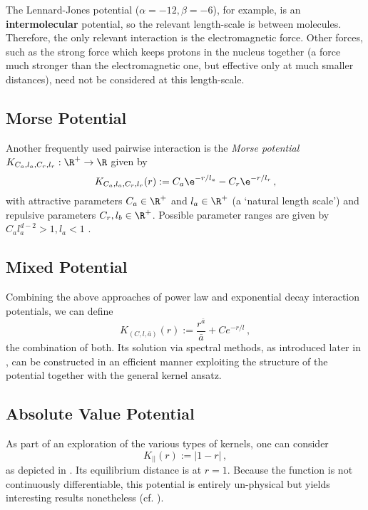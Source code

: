 The Lennard-Jones potential ($\alpha=-12, \beta=-6$), for example, is an \textbf{intermolecular} potential, so the relevant length-scale is between molecules.
Therefore, the only relevant interaction is the electromagnetic force.
Other forces, such as the strong force which keeps protons in the nucleus together (a force much stronger than the electromagnetic one, but effective only at much smaller distances), need not be considered at this length-scale.

\subsection{Morse Potential}
Another frequently used pairwise interaction is the \textit{Morse potential} $K_{C_a, l_a, C_r, l_r}: \R^+ \to \R$ given by
\begin{equation}
  K_{C_a, l_a, C_r, l_r}(r) := C_a \e^{-r / l_a} - C_r \e^{-r / l_r}\,,
  \label{eq:morse-potential}
\end{equation}
with attractive parameters $C_a \in \R^+$ and $l_a \in \R^+$ (a `natural length scale') and repulsive parameters $C_r, l_b \in \R^+$.
Possible parameter ranges are given by $C_a l_a^{d-2} > 1, l_a < 1$ \parencite{2006-self-propelled,2014-explicit-flock-solutions-for-quasi-morse-potentials}.

\subsection{Mixed Potential}
Combining the above approaches of power law and exponential decay interaction potentials, we can define
\begin{equation}
  K_{(C, l, \bar{a})}(r) := \frac{r^{\bar{a}}}{\bar{a}} + C e^{-r/l}\,,
  \label{eq:mixed-potential}
\end{equation}
the combination of both.
Its solution via spectral methods, as introduced later in , can be constructed in an efficient manner exploiting the structure of the potential together with the general kernel ansatz.

\subsection{Absolute Value Potential}
As part of an exploration of the various types of kernels, one can consider
\begin{equation}
  K_{||}(r) := |1-r|\,,
  \label{eq:absvalue-potential}
\end{equation}
as depicted in .
Its equilibrium distance is at $r = 1$.
Because the function is not continuously differentiable, this potential is entirely un-physical but yields interesting results nonetheless (cf. ).

